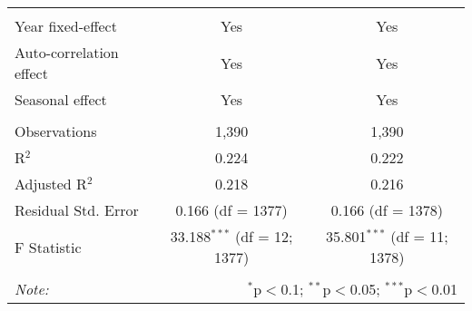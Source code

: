 \begin{table}[!htbp]
\begin{tabular}{@{\extracolsep{5pt}}lcc}
\hline \\[-1.8ex] 
Year fixed-effect & Yes & Yes \\ 
Auto-correlation effect & Yes & Yes \\ 
Seasonal effect & Yes & Yes \\ 
\hline \\[-1.8ex] 
Observations & 1,390 & 1,390 \\ 
R$^{2}$ & 0.224 & 0.222 \\ 
Adjusted R$^{2}$ & 0.218 & 0.216 \\ 
Residual Std. Error & 0.166 (df = 1377) & 0.166 (df = 1378) \\ 
F Statistic & 33.188$^{***}$ (df = 12; 1377) & 35.801$^{***}$ (df = 11; 1378) \\ 
\hline 
\hline \\[-1.8ex] 
\textit{Note:}  & \multicolumn{2}{r}{$^{*}$p$<$0.1; $^{**}$p$<$0.05; $^{***}$p$<$0.01} \\ 
\end{tabular} 
\end{table} 
